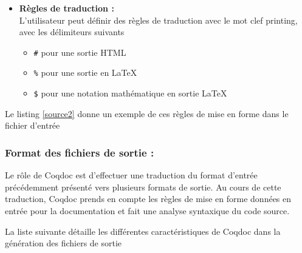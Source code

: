 \documentclass[a4paper, 11pt]{report}
\begin{document}
\begin{itemize}
        (ou afficher) des portions de code avec les délimitant avec
        \texttt{(* begin hide *)} et \texttt{(* end hide *)}
        (pour forcer l'affichage, il suffit de remplacer \texttt{hide} par \texttt{show})
      \item[] \textbf{Règles de traduction :} \\
        L'utilisateur peut définir des règles de traduction avec le mot clef
        printing, avec les délimiteurs suivants
        \begin{itemize}
          \item \texttt{\#} pour une sortie HTML
          \item \texttt{\%} pour une sortie en LaTeX
          \item \texttt{\$} pour une notation mathématique en sortie LaTeX
        \end{itemize}
    \end{itemize}
    Le listing \ref{source2} donne un exemple de ces règles de mise en forme
    dans le fichier d'entrée
    

    \subsubsection{Format des fichiers de sortie :}
    Le rôle de Coqdoc est d'effectuer une traduction du format d'entrée
    précédemment présenté vers plusieurs formats de sortie. Au cours
    de cette traduction, Coqdoc prends en compte les règles de mise en forme
    données en entrée pour la documentation et fait une analyse syntaxique du
    code source.

    La liste suivante détaille les différentes caractéristiques de Coqdoc dans
    la génération des fichiers de sortie
\end{document}

